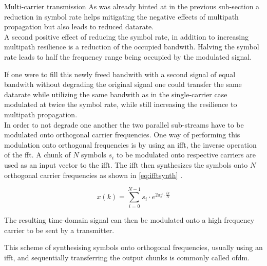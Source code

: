 \begin{subchapter}{Multi-carrier transmission}
  As was already hinted at in the previous sub-section a reduction
  in symbol rate helps mitigating the negative effects of
  multipath propagation but also leads to reduced datarate. \\

  A second positive effect of reducing the symbol rate,
  in addition to increasing multipath resilience is
  a reduction of the occupied bandwith.
  Halving the symbol rate leads to
  half the frequency range being occupied by the
  modulated signal.

  If one were to fill this newly freed bandwith with a
  second signal of equal bandwith without
  degrading the original signal one could
  transfer the same datarate while utilizing the
  same bandwith as in the single-carrier case
  modulated at twice the symbol rate,
  while still increasing the resilience to
  multipath propagation. \\

  In order to not degrade one another the two parallel
  sub-streams have to be modulated onto orthogonal
  carrier frequencies.
  One way of performing this modulation onto orthogonal
  frequencies is by using an \gls{ifft}, the inverse operation
  of the \acrlong{fft}.
  A chunk of $N$ symbols $s_{i}$ to be modulated onto respective carriers
  are used as an input vector to the \gls{ifft}.
  The \gls{ifft} then synthesizes the symbols onto $N$ orthogonal
  carrier frequencies as shown in \autoref{eq:ifftsynth} \cite{kammeyer2012}.

  \begin{equation}
    \label{eq:ifftsynth}
    x(k) = \sum_{i=0}^{N-1} s_{i} \cdot e ^ {2\pi j \cdot \frac{ik}{N}}
  \end{equation}

  The resulting time-domain signal can then be modulated onto
  a high frequency carrier to be sent by a transmitter.

  This scheme of synthesising symbols onto orthogonal
  frequencies, usually using an \gls{ifft}, and sequentially
  transferring the output chunks is commonly called \gls{ofdm}.
\end{subchapter}

